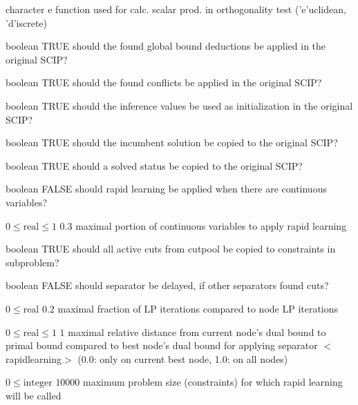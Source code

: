 %
{character}%
{e}%
{function used for calc. scalar prod. in orthogonality test ('e'uclidean, 'd'iscrete)}%
{}

%
{boolean}%
{TRUE}%
{should the found global bound deductions be applied in the original SCIP?}%
{}

%
{boolean}%
{TRUE}%
{should the found conflicts be applied in the original SCIP?}%
{}

%
{boolean}%
{TRUE}%
{should the inference values be used as initialization in the original SCIP?}%
{}

%
{boolean}%
{TRUE}%
{should the incumbent solution be copied to the original SCIP?}%
{}

%
{boolean}%
{TRUE}%
{should a solved status be copied to the original SCIP?}%
{}

%
{boolean}%
{FALSE}%
{should rapid learning be applied when there are continuous variables?}%
{}

%
{$0\leq\textrm{real}\leq1$}%
{$0.3$}%
{maximal portion of continuous variables to apply rapid learning}%
{}

%
{boolean}%
{TRUE}%
{should all active cuts from cutpool be copied to constraints in subproblem?}%
{}

%
{boolean}%
{FALSE}%
{should separator be delayed, if other separators found cuts?}%
{}

%
{$0\leq\textrm{real}$}%
{$0.2$}%
{maximal fraction of LP iterations compared to node LP iterations}%
{}

%
{$0\leq\textrm{real}\leq1$}%
{$1$}%
{maximal relative distance from current node's dual bound to primal bound compared to best node's dual bound for applying separator $<$rapidlearning$>$ (0.0: only on current best node, 1.0: on all nodes)}%
{}

%
{$0\leq\textrm{integer}$}%
{$10000$}%
{maximum problem size (constraints) for which rapid learning will be called}%
{}

